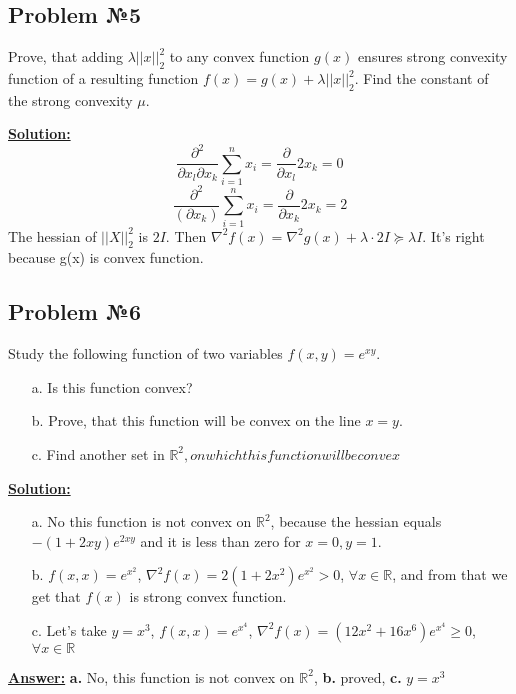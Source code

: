 \subsection{Problem №5}

Prove, that adding $\lambda ||x||_2^2$ to any convex function $g(x)$ ensures strong convexity function of a resulting function $f(x) = g(x) + \lambda ||x||_2^2$. Find the constant of the strong convexity $\mu$.

\underline{\textbf{Solution:}}
\begin{equation*}
    \frac{\partial^2}{\partial x_l \partial x_k} \sum\limits_{i = 1}^n x_i = \frac{\partial}{\partial x_l} 2x_k = 0
\end{equation*}
\begin{equation*}
    \frac{\partial^2}{(\partial x_k)} \sum\limits_{i = 1}^n x_i = \frac{\partial}{\partial x_k} 2x_k = 2
\end{equation*}
The hessian of $||X||_2^2$ is $2 I$. Then $\nabla^2 f(x) = \nabla^2 g(x) + \lambda \cdot 2I \succcurlyeq \lambda I$. It's right because g(x) is convex function.

\subsection{Problem №6}
Study the following function of two variables $f(x, y) = e^{xy}$.
\begin{enumerate}
    \item[a.] Is this function convex?
    \item[b.] Prove, that this function will be convex on the line $x=y$.
    \item[c.] Find another set in $\mathds{R}^2, on which this function will be convex$
\end{enumerate}

\underline{\textbf{Solution:}}
\begin{enumerate}
    \item[a.] No this function is not convex on $\mathds{R}^2$, because the hessian equals $-(1+2xy)e^{2xy}$ and it is less than zero for $x = 0, y = 1$.
    \item[b.] $f(x, x) = e^{x^2}$, $\nabla^2 f(x) = 2(1+2x^2)e^{x^2} > 0$, $\forall x \in \mathds{R}$, and from that we get that $f(x)$ is strong convex function.
    \item[c.] Let's take $y = x^3$, $f(x, x) = e^{x^4}$, $\nabla^2 f(x) = (12x^2 + 16x^6)e^{x^4} \geq 0 $, $\forall x \in \mathds{R}$
\end{enumerate}

\underline{\textbf{Answer:}} 
\textbf{a.} No, this function is not convex on $\mathds{R}^2$, \textbf{b.} proved, \textbf{c.} $y = x^3$

